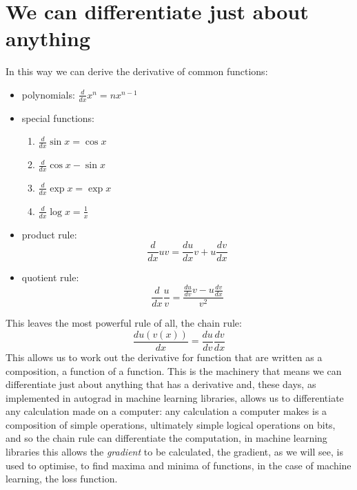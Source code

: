 \documentclass[12pt]{article}
\begin{document}
\section*{We can differentiate just about anything}

In this way we can derive the derivative of common functions:
\begin{itemize}
\item polynomials: $\frac{d}{dx}x^n=nx^{n-1}$
\item special functions:
\begin{enumerate}
\item $\frac{d}{dx}\sin{x}=\cos{x}$
\item $\frac{d}{dx}\cos{x}-\sin{x}$
\item $\frac{d}{dx}\exp{x}=\exp{x}$
\item $\frac{d}{dx}\log{x}= \frac1x$
  \end{enumerate}
\item product rule:
$$\frac{d}{dx}uv = \frac{du}{dx}v+u\frac{dv}{dx}$$
\item quotient rule:
$$\frac{d}{dx}\frac{u}{v}=\frac{\frac{du}{dv}v-u\frac{dv}{dx}}{v^2}$$
\end{itemize}

This leaves the most powerful rule of all, the chain rule:
\begin{equation}
  \frac{du(v(x))}{dx}=\frac{du}{dv}\frac{dv}{dx}
\end{equation}
This allows us to work out the derivative for function that are written
as a composition, a function of a function. This is the machinery that
means we can differentiate just about anything that has a derivative and,
these days, as implemented in autograd in machine learning libraries,
allows us to differentiate any calculation made on a computer: any
calculation a computer makes is a composition of simple operations,
ultimately simple logical operations on bits, and so the chain rule
can differentiate the computation, in machine learning libraries this
allows the \textsl{gradient} to be calculated, the gradient, as we
will see, is used to optimise, to find maxima and minima of functions,
in the case of machine learning, the loss function.
\end{document}
